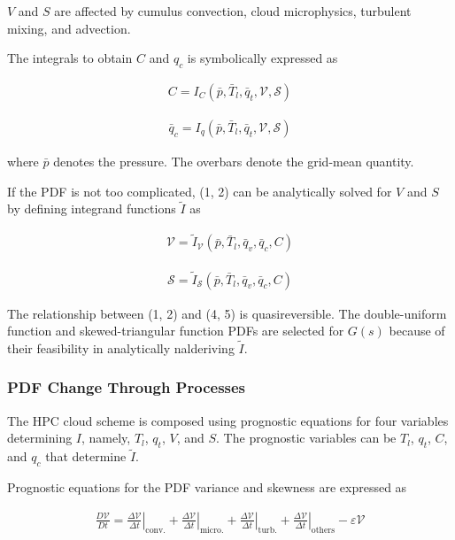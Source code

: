 \(V\) and \(S\) are affected by cumulus convection, cloud microphysics,
turbulent mixing, and advection.

The integrals to obtain \(C\) and \(q_c\) is symbolically expressed as

\begin{eqnarray}
C=I_{C}\left(\bar{p}, \bar{T}_{l}, \bar{q}_{t}, \mathcal{V}, \mathcal{S}\right)
\label{W09-1}
\end{eqnarray}

\begin{eqnarray}
\bar{q}_{c}=I_{q}\left(\bar{p}, \bar{T}_{l}, \bar{q}_{t}, \mathcal{V}, \mathcal{S}\right)
\label{W09-2}
\end{eqnarray}

where \(\bar{p}\) denotes the pressure. The overbars denote the
grid-mean quantity.

If the PDF is not too complicated, (1, 2) can be analytically solved for
\(V\) and \(S\) by defining integrand functions \({\tilde{I}}\) as

\begin{eqnarray}
\mathcal{V}=\tilde{I}_{\mathcal{V}} \left(\bar{p}, \bar{T}_{l}, \bar{{q}}_{v}, \bar{q}_{c}, C\right)
\label{W09-4}
\end{eqnarray}

\begin{eqnarray}
\mathcal{S}=\tilde{I}_{\mathcal{S}} \left(\bar{p}, \bar{T}_{l}, \bar{{q}}_{v}, \bar{q}_{c}, C\right)
\label{W09-5}
\end{eqnarray}

The relationship between (1, 2) and (4, 5) is quasireversible. The
double-uniform function and skewed-triangular function PDFs are selected
for \(G(s)\) because of their feasibility in analytically nalderiving
\({\tilde{I}}\).

\hypertarget{pdf-change-through-processes}{%
\subsubsection{PDF Change Through
Processes}\label{pdf-change-through-processes}}

The HPC cloud scheme is composed using prognostic equations for four
variables determining \(I\), namely, \(T_l\), \(q_t\), \(V\), and \(S\).
The prognostic variables can be \(T_l\), \(q_t\), \(C\), and \(q_c\)
that determine \(\tilde {I}\).

Prognostic equations for the PDF variance and skewness are expressed as

\begin{eqnarray}
\frac{D \mathcal{V}}{D t}=\left.\frac{\Delta \mathcal{V}}{\Delta t}\right|_{\mathrm{conv.}}+\left.\frac{\Delta \mathcal{V}}{\Delta t}\right|_{\mathrm{micro.}}+\left.\frac{\Delta \mathcal{V}}{\Delta t}
\right|_{\mathrm{turb.}}+\left.\frac{\Delta \mathcal{V}}{\Delta t}
\right|_{\mathrm{others}}-\varepsilon \mathcal{V}
\end{eqnarray}

